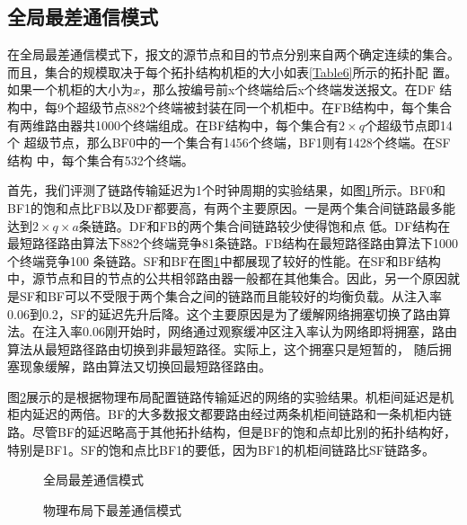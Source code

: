 \subsection{全局最差通信模式}

在全局最差通信模式下，报文的源节点和目的节点分别来自两个确定连续的集合。
而且，集合的规模取决于每个拓扑结构机柜的大小如表\ref{Table6}所示的拓扑配
置。如果一个机柜的大小为$x$，那么按编号前x个终端给后x个终端发送报文。在DF 结构中，每9个超级节点882个终端被封装在同一个机柜中。在FB结构中，每个集合
有两维路由器共1000个终端组成。在BF结构中，每个集合有$2\times q$个超级节点即14 个
超级节点，那么BF0中的一个集合有1456个终端，BF1则有1428个终端。在SF结构
中，每个集合有532个终端。

首先，我们评测了链路传输延迟为1个时钟周期的实验结果，如图\ref{l1adv}所示。BF0和BF1的饱和点比FB以及DF都要高，有两个主要原因。一是两个集合间链路最多能达到$2\times q\times a$条链路。DF和FB的两个集合间链路较少使得饱和点
低。DF结构在最短路径路由算法下882个终端竞争81条链路。FB结构在最短路径路由算法下1000个终端竞争100 条链路。SF和BF在图\ref{l1adv}中都展现了较好的性能。在SF和BF结构中，源节点和目的节点的公共相邻路由器一般都在其他集合。因此，另一个原因就是SF和BF可以不受限于两个集合之间的链路而且能较好的均衡负载。从注入率0.06到0.2，SF的延迟先升后降。这个主要原因是为了缓解网络拥塞切换了路由算法。在注入率0.06刚开始时，网络通过观察缓冲区注入率认为网络即将拥塞，路由算法从最短路径路由切换到非最短路径。实际上，这个拥塞只是短暂的，
随后拥塞现象缓解，路由算法又切换回最短路径路由。

图\ref{layoutgla}展示的是根据物理布局配置链路传输延迟的网络的实验结果。机柜间延迟是机柜内延迟的两倍。BF的大多数报文都要路由经过两条机柜间链路和一条机柜内链路。尽管BF的延迟略高于其他拓扑结构，但是BF的饱和点却比别的拓扑结构好，特别是BF1。SF的饱和点比BF1的要低，因为BF1的机柜间链路比SF链路多。

\begin{figure}[t]
\setlength{\belowcaptionskip}{-.5cm}%
  \centering
 \begin{minipage}[t]{\textwidth}
   \centering
  \vspace{-.3cm}
  \caption{全局最差通信模式}
  \label{l1adv}
  \end{minipage}
 \end{figure}

 \begin{figure}[t]
 \setlength{\belowcaptionskip}{-.5cm}%
  \centering
 \begin{minipage}[t]{\textwidth}
   \centering
  \vspace{-.3cm}
  \caption{物理布局下最差通信模式}
  \label{layoutgla}
  \end{minipage}
  \end{figure}

